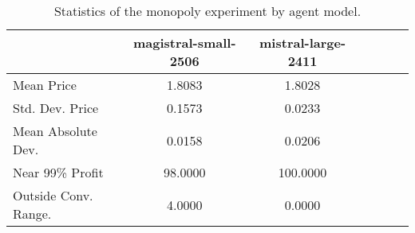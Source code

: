 \begin{table}[H]
\caption{Statistics of the monopoly experiment by agent model.}
\label{tab:monopoly_stats}
\begin{tabular}{lcccccc}
\toprule
 & magistral-small-2506 & mistral-large-2411 \\
\midrule
Mean Price & 1.8083 & 1.8028 \\
Std. Dev. Price & 0.1573 & 0.0233 \\
Mean Absolute Dev. & 0.0158 & 0.0206 \\
Near 99\% Profit & 98.0000 & 100.0000 \\
Outside Conv. Range. & 4.0000 & 0.0000 \\
\bottomrule
\end{tabular}
\end{table}
